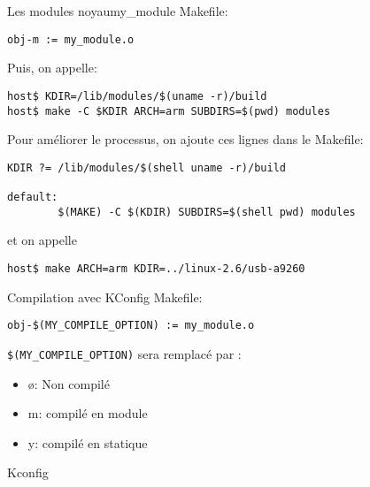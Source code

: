 \begin{frame}[fragile=singleslide]{Les modules noyau}{my\_module}
  Makefile:
  \begin{lstlisting}
obj-m := my_module.o  
  \end{lstlisting}
  Puis, on appelle:
  \begin{lstlisting}
host$ KDIR=/lib/modules/$(uname -r)/build
host$ make -C $KDIR ARCH=arm SUBDIRS=$(pwd) modules
  \end{lstlisting} %
  Pour améliorer le processus, on ajoute ces lignes dans le Makefile:
  \begin{lstlisting}
KDIR ?= /lib/modules/$(shell uname -r)/build

default:
        $(MAKE) -C $(KDIR) SUBDIRS=$(shell pwd) modules
  \end{lstlisting}
  et on appelle
  \begin{lstlisting}
host$ make ARCH=arm KDIR=../linux-2.6/usb-a9260 
  \end{lstlisting} %
\end{frame}

\begin{frame}[fragile=singleslide]{Compilation avec KConfig}
  Makefile:
  \begin{lstlisting}
obj-$(MY_COMPILE_OPTION) := my_module.o  
  \end{lstlisting} %
  \verb+$(MY_COMPILE_OPTION)+ sera remplacé par :
  \begin{itemize}
  \item ø: Non compilé
  \item m: compilé en module
  \item y: compilé en statique
  \end{itemize}
  Kconfig
  
\end{frame}

